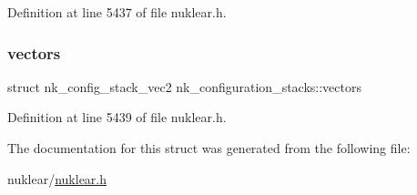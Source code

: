 Definition at line 5437 of file nuklear.\+h.

\mbox{\label{structnk__configuration__stacks_a24a2fbd356785b0ac5dc302605dbe736}} 
\subsubsection{\texorpdfstring{vectors}{vectors}}
{\footnotesize\ttfamily struct nk\+\_\+config\+\_\+stack\+\_\+vec2 nk\+\_\+configuration\+\_\+stacks\+::vectors}



Definition at line 5439 of file nuklear.\+h.



The documentation for this struct was generated from the following file\+:\begin{DoxyCompactItemize}
\item 
nuklear/\mbox{\hyperlink{nuklear_8h}{nuklear.\+h}}\end{DoxyCompactItemize}
